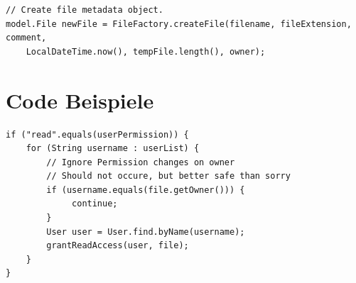 \documentclass[12pt,DIV14,BCOR10mm,a4paper,parskip=half-,headsepline,headinclude,english,ngerman,bibliography=totocnumbered]{scrreprt}
\begin{document}
\begin{appendices}
\begin{lstlisting}
// Create file metadata object.
model.File newFile = FileFactory.createFile(filename, fileExtension, comment,
    LocalDateTime.now(), tempFile.length(), owner);
\end{lstlisting}

\label{fileraceplugin}


\chapter{Code Beispiele}
\label{filepermissions}
\begin{lstlisting}
if ("read".equals(userPermission)) {
	for (String username : userList) {
		// Ignore Permission changes on owner
		// Should not occure, but better safe than sorry
		if (username.equals(file.getOwner())) {
		     continue;
		}
		User user = User.find.byName(username);
		grantReadAccess(user, file);
	}
}
\end{lstlisting}


\end{appendices}
\end{document}
